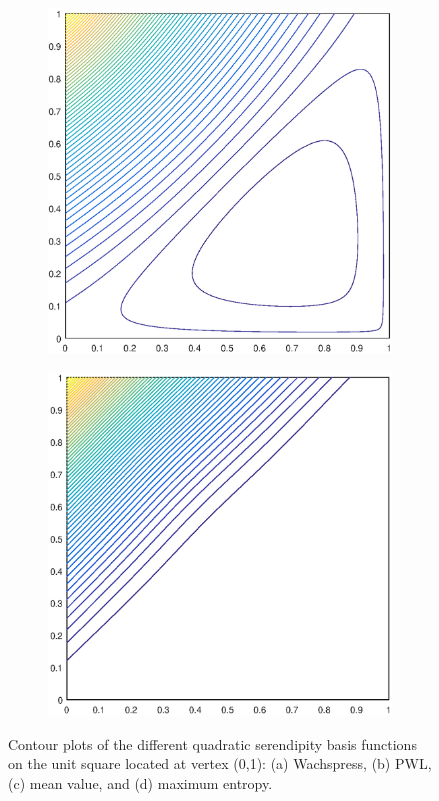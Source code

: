 \documentclass[11pt]{article}
\begin{document}
\begin{figure}
\begin{subfigure}[b]{0.25\textwidth}
		\caption{}
	\end{subfigure}
	\vfill
	\begin{subfigure}[b]{0.25\textwidth}
		\centering
		\includegraphics[width=\textwidth]{figures/square_MV2_contour_b4.eps}
		\caption{}
	\end{subfigure}
	\hspace{1cm}
	\begin{subfigure}[b]{0.25\textwidth}
		\centering
		\includegraphics[width=\textwidth]{figures/square_MAXENT2_contour_b4.eps}
		\caption{}
	\end{subfigure}
\caption{Contour plots of the different quadratic serendipity basis functions on the unit square located at vertex (0,1): (a) Wachspress, (b) PWL, (c) mean value, and (d) maximum entropy.}
\end{figure}
\end{document}
